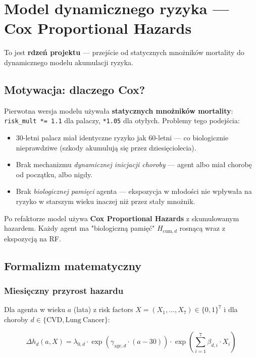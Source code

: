\documentclass[11pt,a4paper]{article}
\newcommand{\cum}[1][]{H_{\mathrm{cum}#1}}
\newcommand{\baseh}{\lambda}                       %
\begin{document}
\newpage
\section{Model dynamicznego ryzyka --- Cox Proportional Hazards}

To jest \textbf{rdzeń projektu} --- przejście od statycznych mnożników mortality do dynamicznego modelu akumulacji ryzyka.

\subsection{Motywacja: dlaczego Cox?}

Pierwotna wersja modelu używała \textbf{statycznych mnożników mortality}: \texttt{risk\_mult *= 1.1} dla palaczy, \texttt{*1.05} dla otyłych. Problemy tego podejścia:

\begin{itemize}[leftmargin=*]
  \item 30-letni palacz miał identyczne ryzyko jak 60-letni --- co biologicznie nieprawdziwe (szkody akumulują się przez dziesięciolecia).
  \item Brak mechanizmu \emph{dynamicznej inicjacji choroby} --- agent albo miał chorobę od początku, albo nigdy.
  \item Brak \emph{biologicznej pamięci} agenta --- ekspozycja w młodości nie wpływała na ryzyko w starszym wieku inaczej niż przez stały mnożnik.
\end{itemize}

Po refaktorze model używa \textbf{Cox Proportional Hazards} z skumulowanym hazardem. Każdy agent ma "biologiczną pamięć" $\cum[,d]$ rosnącą wraz z ekspozycją na RF.

\subsection{Formalizm matematyczny}

\subsubsection{Miesięczny przyrost hazardu}

Dla agenta w wieku $a$ (lata) z risk factors $X = (X_1, \ldots, X_7) \in \{0,1\}^7$ i dla choroby $d \in \{\mathrm{CVD}, \mathrm{Lung\ Cancer}\}$:

\begin{formulabox}
\[
\Delta h_d(a, X) = \baseh_{0,d} \cdot \exp(\gamma_{\text{age},d} \cdot (a - 30)) \cdot \exp\left(\sum_{i=1}^{7} \beta_{d,i} \cdot X_i\right)
\]
\end{formulabox}
\end{document}
